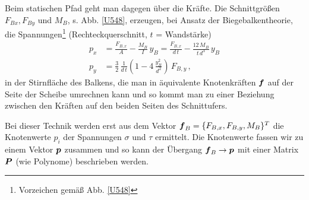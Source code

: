 {Beim statischen Pfad  geht man dagegen \"{u}ber die Kr\"{a}fte. Die Schnittgr\"{o}{\ss}en $F_{Bx}, F_{By}$ und $M_B$, s. Abb. \ref{U548}, erzeugen, bei Ansatz der Biegebalkentheorie, die Spannungen\footnote{Vorzeichen gem\"{a}{\ss} Abb. \ref{U548}} (Rechteckquerschnitt, $t$ = Wandst\"{a}rke)
\begin{align}
p_x &= \frac{F_{B,x}}{A} - \frac{M_B}{I}\,y_B = \frac{F_{B,x}}{d\,t} - \frac{12\,M_B}{t\,d^3}\,y_B \\
p_y &= \frac{3}{2}\,\frac{1}{d\,t} (1 - 4\,\frac{y_B^2}{d^2})\,F_{B,y}\,,
\end{align}
in der Stirnfl\"{a}che des Balkens, die man in \"{a}quivalente Knotenkr\"{a}ften $\mbox{\boldmath $f$}$ auf der Seite der Scheibe umrechnen kann und so kommt man zu einer Beziehung zwischen den Kr\"{a}ften auf den beiden Seiten des Schnittufers.

Bei dieser Technik werden erst aus dem Vektor $\mbox{\boldmath $f$}_B = \{F_{B,x}, F_{B,y}, M_B\}^T$ die Knotenwerte $p_i$ der Spannungen $\sigma$ und $\tau$ ermittelt. Die Knotenwerte fassen wir zu einem  Vektor $\mbox{\boldmath $p$} $ zusammen und so kann der \"{U}bergang $\mbox{\boldmath $f$}_B \to \mbox{\boldmath $p$}$ mit einer Matrix $\mbox{\boldmath $P$}$ (wie Polynome) beschrieben werden.

}
